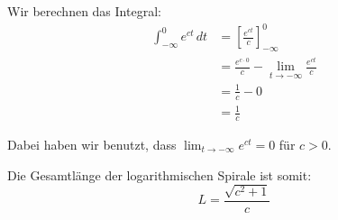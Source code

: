 \documentclass{article}
\begin{document}
Wir berechnen das Integral:
\begin{align}
\int_{-\infty}^0 e^{ct} \, dt &= \left[\frac{e^{ct}}{c}\right]_{-\infty}^0\\
&= \frac{e^{c \cdot 0}}{c} - \lim_{t \to -\infty} \frac{e^{ct}}{c}\\
&= \frac{1}{c} - 0\\
&= \frac{1}{c}
\end{align}

Dabei haben wir benutzt, dass $\lim_{t \to -\infty} e^{ct} = 0$ für $c > 0$.

Die Gesamtlänge der logarithmischen Spirale ist somit:
$$\boxed{L = \frac{\sqrt{c^2 + 1}}{c}}$$
\end{document}
